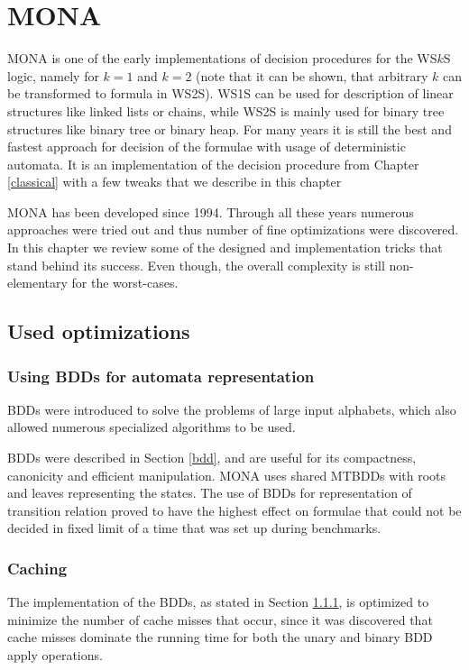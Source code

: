\chapter{\textsc{MONA}}\label{monachap}

 \textsc{MONA} \cite{mona} is one of the early implementations of decision
 procedures for the WS$k$S logic, namely for $k = 1$ and $k = 2$ (note that it
 can be shown, that arbitrary $k$ can be transformed to formula in WS2S). WS1S
 can be used for description of linear structures like linked lists or chains,
 while WS2S is mainly used for binary tree structures like binary tree or binary
 heap. For many years it is still the best and fastest approach for decision of
 the formulae with usage of deterministic automata. It is an implementation of
 the decision procedure from Chapter \ref{classical} with a few tweaks that we
 describe in this chapter

\textsc{MONA} has been developed since 1994. Through all these years numerous
approaches were tried out and thus number of fine optimizations were discovered.
In this chapter we review some of the designed and implementation tricks that
stand behind its success. Even though, the overall complexity is still
non-elementary for the worst-cases.

 \section{Used optimizations}\label{monasecrets}
\subsection{Using BDDs for automata representation}\label{monabdd}
BDDs were introduced to solve the problems of large input alphabets, which also
allowed numerous specialized algorithms to be used.

BDDs were described in Section \ref{bdd}, and are useful for its compactness,
canonicity and efficient manipulation. \textsc{MONA} uses shared MTBDDs with
roots and leaves representing the states. The use of BDDs for representation  of
transition relation proved to have the highest effect on formulae that could not
be decided in fixed limit of a time that was set up during benchmarks.

\subsection{Caching}
The implementation of the BDDs, as stated in Section \ref{monabdd}, is optimized
to minimize the number of cache misses that occur, since it was discovered that
cache misses dominate the running time for both the unary and binary BDD apply
operations.

